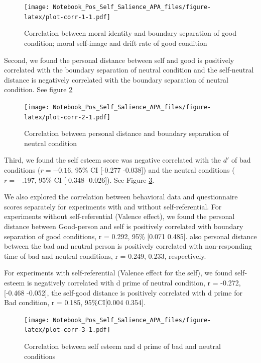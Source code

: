\documentclass[
  english,
  man]{apa6}
\begin{document}
\begin{figure}
\centering
\texttt{[image: Notebook\_Pos\_Self\_Salience\_APA\_files/figure-latex/plot-corr-1-1.pdf]}
\caption{\label{fig:plot-corr-1}Correlation between moral identity and boundary separation of good condition; moral self-image and drift rate of good condition}
\end{figure}

Second, we found the personal distance between self and good is positively correlated with the boundary separation of neutral condition and the self-neutral distance is negatively correlated with the boundary separation of neutral condition. See figure \ref{fig:plot-corr-2}

\begin{figure}
\centering
\texttt{[image: Notebook\_Pos\_Self\_Salience\_APA\_files/figure-latex/plot-corr-2-1.pdf]}
\caption{\label{fig:plot-corr-2}Correlation between personal distance and boundary separation of neutral condition}
\end{figure}

Third, we found the self esteem score was negative correlated with the \(d'\) of bad conditions (\(r = -0.16\), 95\% CI {[}-0.277 -0.038{]}) and the neutral conditions (\(r = -.197\), 95\% CI {[}-0.348 -0.026{]}). See Figure \ref{fig:plot-corr-3}.

We also explored the correlation between behavioral data and questionnaire scores separately for experiments with and without self-referential. For experiments without self-referential (Valence effect), we found the personal distance between Good-person and self is positively correlated with boundary separation of good conditions, r = 0.292, 95\% {[}0.071 0.485{]}. also personal distance between the bad and neutral person is positively correlated with non-responding time of bad and neutral conditions, r = 0.249, 0.233, respectively.

For experiments with self-referential (Valence effect for the self), we found self-esteem is negatively correlated with d prime of neutral condition, r = -0.272, {[}-0.468 -0.052{]}, the self-good distance is positively correlated with d prime for Bad condition, r = 0.185, 95\%CI{[}0.004 0.354{]}.

\begin{figure}
\centering
\texttt{[image: Notebook\_Pos\_Self\_Salience\_APA\_files/figure-latex/plot-corr-3-1.pdf]}
\caption{\label{fig:plot-corr-3}Correlation between self esteem and d prime of bad and neutral conditions}
\end{figure}
\end{document}
